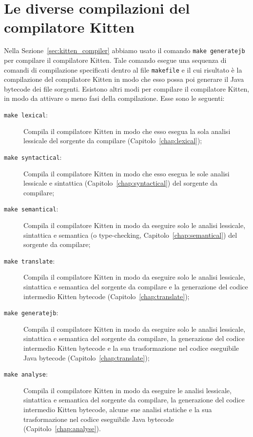 \section{Le diverse compilazioni del compilatore Kitten}
  \label{sec:kitten_compilations}
%
Nella Sezione~\ref{sec:kitten_compiler} abbiamo usato il comando
\texttt{make generatejb} per compilare il compilatore Kitten. Tale comando
esegue una sequenza di comandi di compilazione specificati dentro al file
\texttt{makefile} e il cui risultato \`e la compilazione del compilatore
Kitten in modo che esso possa poi
generare il Java bytecode dei file sorgenti. Esistono
altri modi per compilare il compilatore Kitten, in modo da attivare \piu o
meno fasi della compilazione. Esse sono le seguenti:
%
\begin{description}
\item[\texttt{make lexical}:]
  Compila il compilatore Kitten in modo che esso esegua
  la sola analisi lessicale
  del sorgente da compilare (Capitolo~\ref{chap:lexical});
\item[\texttt{make syntactical}:]
  Compila il compilatore Kitten in modo che esso esegua
  le sole analisi lessicale
  e sintattica (Capitolo~\ref{chap:syntactical}) del sorgente da compilare;
\item[\texttt{make semantical}:]
  Compila il compilatore Kitten in modo da eseguire solo le analisi lessicale,
  sintattica e semantica (o type-checking,
  Capitolo~\ref{chap:semantical}) del sorgente da compilare;
\item[\texttt{make translate}:]
  Compila il compilatore Kitten in modo da eseguire solo le analisi lessicale,
  sintattica e semantica del sorgente da compilare e la generazione del
  codice intermedio Kitten bytecode
  (Capitolo~\ref{chap:translate});
\item[\texttt{make generatejb}:]
  Compila il compilatore Kitten in modo da eseguire solo le analisi lessicale,
  sintattica e semantica del sorgente da compilare, la generazione del codice
  intermedio Kitten bytecode e la sua trasformazione nel codice eseguibile
  Java bytecode (Capitolo~\ref{chap:translate});
\item[\texttt{make analyse}:]
  Compila il compilatore Kitten in modo da eseguire le analisi lessicale,
  sintattica e semantica del sorgente da compilare, la generazione del codice
  intermedio Kitten bytecode, alcune sue analisi statiche
  e la sua trasformazione nel codice eseguibile
  Java bytecode (Capitolo~\ref{chap:analyse}).
\end{description}
%

